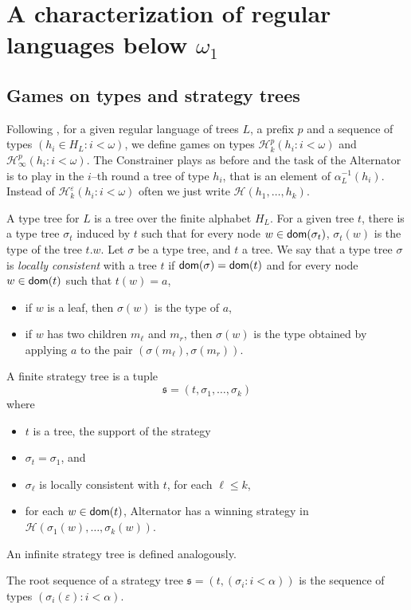 
\section{A characterization of regular languages  below $\omega_1$}
\subsection{Games on types and strategy trees}
Following \cite{bp}, for a given regular language of trees $L$, a prefix $p$ and a sequence of types $(h_i\in H_L : i <\omega)$, we define games on types $\mathcal{H}^p_k(h_i : i < \omega)$ and $\mathcal{H}^p_\infty(h_i : i < \omega)$. The Constrainer plays as before and the task of the Alternator is to play in the $i$--th round a tree of type $h_i$, that is an element of $\alpha_L^{-1}(h_i)$. Instead of $\mathcal{H}^\varepsilon_k(h_i : i < \omega)$ often we just write $\mathcal{H}(h_1, \dots, h_k)$.


A type tree for $L$ is a tree over the finite alphabet $H_L$. For a given tree $t$, there is a type tree $\sigma_t$ induced by $t$ such that for every node $w \in \mathsf{dom}(\sigma_t)$, $\sigma_t(w)$ is the type of the tree $t.w$.
Let $\sigma$ be a type tree, and $t$ a tree. We say that a type tree $\sigma$ is \emph{locally consistent} with a tree $t$ if $\mathsf{dom}(\sigma)=\mathsf{dom}(t)$ and for every node $w \in \mathsf{dom}(t)$ such that $t(w)=a$, 
\begin{itemize}
\item if $w$ is a leaf, then $\sigma(w)$ is the type of $a$,
\item if $w$ has two children $m_\ell$ and $m_r$, then $\sigma(w)$ is the type obtained by applying $a$ to the pair $(\sigma(m_\ell), \sigma(m_r))$.
\end{itemize}

\begin{definition} A finite strategy tree is a tuple
\[ \mathfrak{s}=(t, \sigma_1, \dots, \sigma_k) \] where
\begin{itemize}
\item $t$ is a tree, the support of the strategy
\item $\sigma_t=\sigma_1$, and
\item $\sigma_\ell$ is locally consistent with $t$, for each $\ell \leq k$,
\item for each $w \in \mathsf{dom}(t)$, Alternator has a winning strategy in $\mathcal{H}(\sigma_1(w), \dots, \sigma_k(w))$.
\end{itemize}
An  infinite strategy tree is defined analogously.
\end{definition}
The root sequence of a strategy tree $\mathfrak{s}=(t, (\sigma_i : i < \alpha))$ is the sequence of types $(\sigma_i(\varepsilon): i < \alpha)$.

